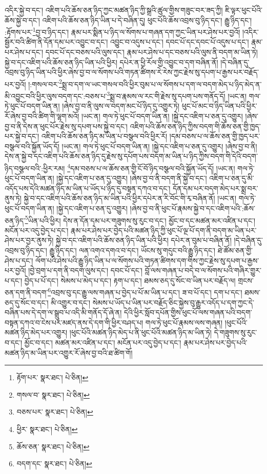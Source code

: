འདིར་སྐྱེ་བ་དང་། འཇིག་པའི་ཆོས་ཅན་ཉིད་ཀྱང་མཚན་ཉིད་ཀྱི་སྒྲའི་ཚུལ་གྱིས་གཟུང་བར་ཟད་ཀྱི། ཇི་ལྟར་ཕུང་པོའི་ཆོས་སྐྱེ་བ་དང་། འཇིག་པའི་ཆོས་ཅན་ཉིད་ཡིན་པ་དེ་བཞིན་དུ། ཕུང་པོའི་ཆོས་འབྲས་བུ་ཉིད་དང་། རྒྱུ་ཉིད་དང་། :རྟོགས་པར་\footnote{རྟོག་པར་  སྣར་ཐང་།  པེ་ཅིན། }བྱ་བ་ཉིད་དང་། རྣམ་པར་སྨིན་པ་ཉིད་ལ་སོགས་པ་གཞན་དག་ཀྱང་ཡིན་པར་ཤེས་པར་བྱའོ། །འདིར་སྦྱོར་བའི་ཚིག་ནི་དོན་དམ་པར་འབྱུང་བ་དང་། འབྱུང་བ་འདུས་པ་དང་། དབང་པོ་དང་དབང་པོ་འདུས་པ་དང་། རྣམ་པར་ཤེས་པ་དང་། དབང་པོ་དང་བཅས་པའི་ལུས་དང་། རྣམ་པར་ཤེས་པ་དང་བཅས་པའི་ལུས་ནི་བདག་མ་ཡིན་ཏེ། སྐྱེ་བ་དང་འཇིག་པའི་ཆོས་ཅན་ཉིད་ཡིན་པའི་ཕྱིར། དཔེར་ན་ཕྱི་རོལ་གྱི་འབྱུང་བ་དག་བཞིན་ནོ། །དེ་བཞིན་དུ་འབྲས་བུ་ཉིད་ཡིན་པའི་ཕྱིར་ཞེས་བྱ་བ་ལ་སོགས་པའི་གཏན་ཚིགས་རེ་རེས་ཀྱང་རྗེས་སུ་དཔག་པ་རྒྱས་པར་བརྗོད་པར་བྱའོ། །:གསལ་བར་\footnote{གསལ་བ་  སྣར་ཐང་།  པེ་ཅིན། }སྨྲ་བ་དག་ལ་ཡང་གསལ་བའི་ཕྱིར་བུམ་པ་ལ་སོགས་པ་དག་ལ་བདག་མེད་པ་ཉིད་མེད་ན་མི་འབྱུང་བའི་ཕྱིར་ལུས་བདག་དང་:བཅས་པ་\footnote{བཅས་པར་  སྣར་ཐང་།  པེ་ཅིན། }སྨྲ་བ་རྣམས་ལ་རང་གི་རྗེས་སུ་དཔག་པས་གནོད་དོ། །ཡང་ན། གལ་ཏེ་ཕུང་པོ་བདག་ཡིན་ན། །ཞེས་བྱ་བ་ནི་ལུས་ལ་བདག་མང་པོ་ཉིད་དུ་འགྱུར་ཏེ། ཕུང་པོ་མང་བ་ཉིད་ཡིན་པའི་ཕྱིར་རོ་ཞེས་བྱ་བའི་ཚིག་གི་ལྷག་མའོ། །ཡང་ན། གལ་ཏེ་ཕུང་པོ་བདག་ཡིན་ན། །སྐྱེ་དང་འཇིག་པ་ཅན་དུ་འགྱུར། །ཞེས་བྱ་བ་ནི་དེས་ན་ཕུང་པོར་རྗེས་སུ་དཔག་པས་སྐྱེ་བ་དང་། འཇིག་པའི་ཆོས་ཅན་ཉིད་ཀྱིས་བདག་གི་ཆོས་ཅན་གྱི་ཁྱད་པར་སྐྱེ་བ་དང་། འཇིག་པའི་ཆོས་ཅན་ཉིད་མ་ཡིན་པ་བསྩལ་བའི་ཕྱིར་རོ། །དམ་བཅས་པ་ལ་ཆོས་ཅན་གྱི་ཁྱད་པར་བསྩལ་བའི་སྐྱོན་ཡོད་དོ། །ཡང་ན། གལ་ཏེ་ཕུང་པོ་བདག་ཡིན་ན། །སྐྱེ་དང་འཇིག་པ་ཅན་དུ་འགྱུར། །ཞེས་བྱ་བ་ནི། དེས་ན་སྐྱེ་བ་དང་འཇིག་པའི་ཆོས་ཅན་ཉིད་དུ་རྗེས་སུ་དཔོག་པས་བདག་མ་ཡིན་པ་ཉིད་ཀྱིས་བདག་གི་དེའི་བདག་ཉིད་བསྩལ་བའི་:ཕྱིར་རམ། \footnote{ཕྱིར་  སྣར་ཐང་།  པེ་ཅིན། }དམ་བཅས་པ་ལ་ཆོས་ཅན་གྱི་ངོ་བོ་ཉིད་བསྩལ་བའི་སྐྱོན་ཡོད་དོ། །ཡང་ན། གལ་ཏེ་ཕུང་པོ་བདག་ཡིན་ན། །སྐྱེ་དང་འཇིག་པ་ཅན་དུ་འགྱུར། །ཞེས་བྱ་བ་ནི་བདག་ནི་སྐྱེ་བ་དང་། འཇིག་པ་ཅན་དུ་མི་འདོད་པས་དེའི་མཚན་ཉིད་མ་ཡིན་པ་ཡོད་པ་ཉིད་དུ་བསྟན་དཀའ་བ་དང་། དོན་དམ་པར་བདག་མེད་པར་སྨྲ་བར་ནུས་ཏེ། སྐྱེ་བ་དང་འཇིག་པའི་ཆོས་ཅན་ཉིད་མ་ཡིན་པའི་ཕྱིར་དཔེར་ན་རི་བོང་གི་རྭ་བཞིན་ནོ། །ཡང་ན། གལ་ཏེ་ཕུང་པོ་བདག་ཡིན་ན། །སྐྱེ་དང་འཇིག་པ་ཅན་དུ་འགྱུར། །ཞེས་བྱ་བ་ནི་ཕུང་པོ་རྣམས་སྐྱེ་བ་དང་འཇིག་པའི་:ཆོས་ཅན་ཉིད་\footnote{ཆོས་ཅན་  སྣར་ཐང་།  པེ་ཅིན། }ཡིན་པའི་ཕྱིར། དེས་ན་དོན་དམ་པར་གཟུགས་སུ་རུང་བ་དང་། མྱོང་བ་དང་མཚན་མར་འཛིན་པ་དང་། མངོན་པར་འདུ་བྱེད་པ་དང་། རྣམ་པར་ཤེས་པར་བྱེད་པའི་མཚན་ཉིད་ཀྱི་ཕུང་པོ་ལྔ་པོ་དག་ནི་བདག་མ་ཡིན་པར་ཤེས་པར་བྱར་ནུས་ཏེ། སྐྱེ་བ་དང་འཇིག་པའི་ཆོས་ཅན་ཉིད་ཡིན་པའི་ཕྱིར། དཔེར་ན་བུམ་པ་བཞིན་ནོ། །དེ་བཞིན་དུ་འབྲས་བུ་ཉིད་དང་། རྒྱུ་ཉིད་དང་། ལན་འགའ་དགའ་བ་དང་། ཡོངས་སུ་གདུང་བའི་རྒྱུ་ཉིད་དང་། ཐེ་ཚོམ་ཅན་གྱི་ཤེས་པ་དང་། ལོག་པའི་ཤེས་པའི་རྒྱུ་ཉིད་ཡིན་པ་ལ་སོགས་པའི་གཏན་ཚིགས་དག་གིས་ཀྱང་རྗེས་སུ་དཔག་པ་རྒྱས་པར་བྱའོ། །བྱེ་བྲག་པ་དག་ནི་བདག་ལུས་དང་། དབང་པོ་དང་། བློ་ལས་གཞན་པ་བདེ་བ་ལ་སོགས་པའི་གཞིར་གྱུར་པ་དང་། བྱེད་པ་པོ་དང་། སེམས་པ་མེད་པ་དང་། རྟག་པ་དང་། ཐམས་ཅད་དུ་སོང་བ་ཡིན་པར་བརྗོད་ལ། གྲངས་ཅན་དག་ནི་བདག་\footnote{བདག་དང་  སྣར་ཐང་།  པེ་ཅིན། }འབྲས་བུ་དང་རྒྱུ་ལས་གཞན་པ་བྱེད་པ་པོ་མ་ཡིན་པ་དང་། ཟ་བ་པོ་དང་། དག་པ་དང་། ཐམས་ཅད་དུ་སོང་བ་དང་། མི་འགྱུར་བ་དང་། སེམས་པ་ཡོད་པ་ཡིན་པར་བརྗོད་ཅིང་སྐྱེས་བུ་རྒྱུར་འདོད་པ་དག་ཀྱང་དེ་བཞིན་པས་དེ་དག་ལ་སྒྲུབ་པ་འདི་མི་གནོད་དོ་ཞེ་ན། དེའི་ཕྱིར་སློབ་དཔོན་གྱིས་ཕུང་པོ་ལས་གཞན་པའི་བདག་བསྟན་དཀའ་བ་ངེས་པར་མཛད་ནས་དེ་དག་གི་ཕྱིར་བཤད་པ། གལ་ཏེ་ཕུང་པོ་རྣམས་ལས་གཞན། །ཕུང་པོའི་མཚན་ཉིད་མེད་པར་འགྱུར། །ཕུང་པོའི་མཚན་ཉིད་མེད་པ་ནི་ཕུང་པོའི་མཚན་ཉིད་མ་ཡིན་ཏེ། དེ་གཟུགས་སུ་རུང་བ་དང་། མྱོང་བ་དང་། མཚན་མར་འཛིན་པ་དང་། མངོན་པར་འདུ་བྱེད་པ་དང་། རྣམ་པར་ཤེས་པར་བྱེད་པའི་མཚན་ཉིད་མ་ཡིན་པར་འགྱུར་རོ་ཞེས་བྱ་བའི་ཐ་ཚིག་གོ། 